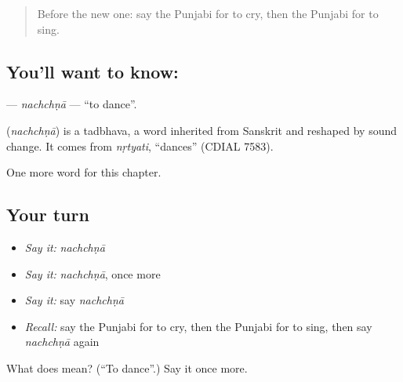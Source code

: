 \label{lesson:PA-C59-nachchna}



\begin{quote}
Before the new one: say the Punjabi for to cry, then the Punjabi for to sing.
\end{quote}

\subsection*{You'll want to know: }
\textbf{} — \emph{nachchṇā} — \textquotedblleft{}to dance\textquotedblright{}.

\begin{cousinweb}
\textbf{} (\emph{nachchṇā}) is a tadbhava, a word inherited from Sanskrit and reshaped by sound change. It comes from \emph{nṛtyati}, \textquotedblleft{}dances\textquotedblright{} (CDIAL 7583).
\end{cousinweb}

\begin{grammarlens}[title={What you've built}]
One more word for this chapter.
\end{grammarlens}

\subsection*{Your turn}
\begin{itemize}
\raggedright
  \item \emph{Say it:} \emph{nachchṇā}
  \item \emph{Say it:} \emph{nachchṇā}, once more
  \item \emph{Say it:} say \emph{nachchṇā}
  \item \emph{Recall:} say the Punjabi for to cry, then the Punjabi for to sing, then say \emph{nachchṇā} again
\end{itemize}

\begin{tcolorbox}[breakable,colback=teal!4,colframe=teal!35!black,title={Before you move on}]
What does  mean? (\textquotedblleft{}To dance\textquotedblright{}.) Say it once more.
\end{tcolorbox}
